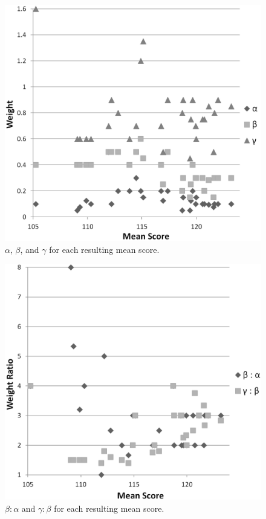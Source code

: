 \documentclass[letterpaper]{article}
\begin{document}
\begin{figure}
\begin{center}
\includegraphics[width=1\linewidth]{images/1-2-3_weights.png}
\end{center}
\caption{$\alpha$, $\beta$, and $\gamma$ for each resulting mean score.}
\label{fig:123weights}
\end{figure}

\begin{figure}
\begin{center}
\includegraphics[width=1\linewidth]{images/1-2-3_ratios.png}
\end{center}
\caption{$\beta:\alpha$ and $\gamma:\beta$ for each resulting mean score.}
\label{fig:123ratios}
\end{figure}
\end{document}
